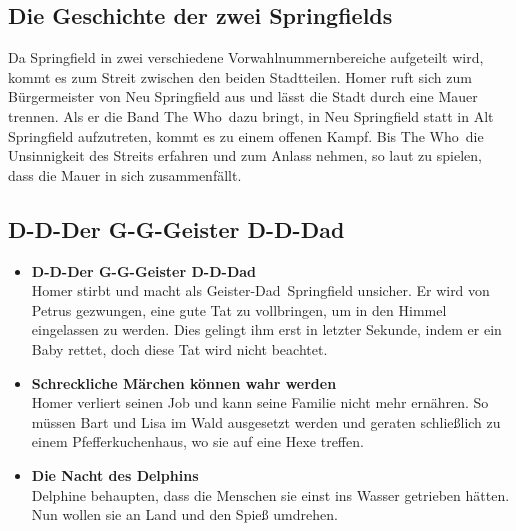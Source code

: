 	
\subsection{Die Geschichte der zwei Springfields}\label{BABF20}
Da Springfield in zwei verschiedene Vorwahlnummernbereiche aufgeteilt wird, kommt es zum Streit zwischen den beiden Stadtteilen. Homer ruft sich zum Bürgermeister von Neu Springfield aus und lässt die Stadt durch eine Mauer trennen. Als er die Band \glqq The Who\grqq\ dazu bringt, in Neu Springfield statt in Alt Springfield aufzutreten, kommt es zu einem offenen Kampf. Bis \glqq The Who\grqq\ die Unsinnigkeit des Streits erfahren und zum Anlass nehmen, so laut zu spielen, dass die Mauer in sich zusammenfällt.


\subsection{D-D-Der G-G-Geister D-D-Dad}\label{BABF21}
\begin{itemize}
	\item \textbf{D-D-Der G-G-Geister D-D-Dad}\\ Homer stirbt und macht als \glqq Geister-Dad\grqq\ Springfield unsicher. Er wird von Petrus gezwungen, eine gute Tat zu vollbringen, um in den Himmel eingelassen zu werden. Dies gelingt ihm erst in letzter Sekunde, indem er ein Baby rettet, doch diese Tat wird nicht beachtet.
	\item \textbf{Schreckliche Märchen können wahr werden}\\ Homer verliert seinen Job und kann seine Familie nicht mehr ernähren. So müssen Bart und Lisa im Wald ausgesetzt werden und geraten schließlich zu einem Pfefferkuchenhaus, wo sie auf eine Hexe treffen.
	\item \textbf{Die Nacht des Delphins}\\ Delphine behaupten, dass die Menschen sie einst ins Wasser getrieben hätten. Nun wollen sie an Land und den Spieß umdrehen. 
\end{itemize}


